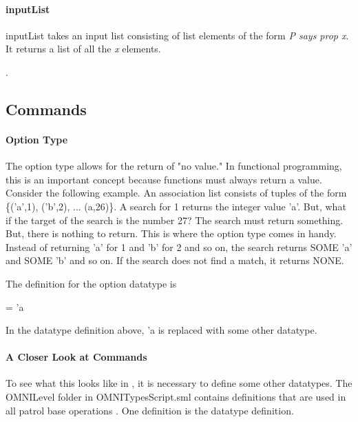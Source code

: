 \documentclass[../../main/main.tex]{subfiles}
\begin{document}
\HOLssmTheoremsextractInputXXdef


\paragraph*{inputList}
inputList takes an input list consisting of list elements of the form \textit{P says prop x}.  It returns a list of all the \textit{x} elements.
\begin{tabbing}
\parskip=8pt
\HOLTokenTurnstile{} \HOLSymConst{\HOLTokenForall{}}. \\
\hspace{0.3cm}   \HOLSymConst{=}   
\parskip=18pt
\end{tabbing}


\subsection{Commands}
\paragraph*{Option Type}\label{option}
The option type allows for the return of "no value."  In functional programming, this is an important concept because functions must always return a value.  Consider the following example.
An association list consists of tuples of the form \{('a',1), ('b',2), ... (a,26)\}. A search for 1 returns the integer value 'a'.  But, what if the target of the search is the number 27?  The search must return something.  But, there is nothing to return.  This is where the option type comes in handy.  Instead of returning 'a' for 1 and 'b' for 2 and so on, the search returns SOME 'a' and SOME 'b' and so on.  If the search does not find a match, it returns NONE.

The definition for the option datatype is

 =  \HOLTokenBar{}  'a

In the datatype definition above, 'a is replaced with some other datatype.  

\paragraph*{A Closer Look at Commands}
To see what this looks like in , it is necessary to define some other datatypes. The OMNILevel folder in OMNITypesScript.sml contains definitions that are used in all patrol base operations . One definition is the  datatype definition.
\end{document}
